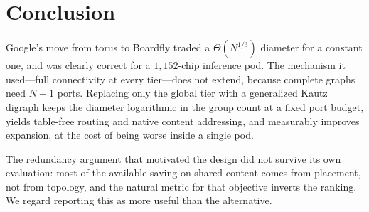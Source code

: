 \documentclass[sigconf,nonacm]{acmart}
\theoremstyle{acmdefinition}%
\begin{document}
\section{Conclusion}

Google's move from torus to Boardfly traded a $\Theta(N^{1/3})$ diameter for a
constant one, and was clearly correct for a $1{,}152$-chip inference pod. The
mechanism it used---full connectivity at every tier---does not extend, because
complete graphs need $N-1$ ports. Replacing only the global tier with a
generalized Kautz digraph keeps the diameter logarithmic in the group count at a
fixed port budget, yields table-free routing and native content addressing, and
measurably improves expansion, at the cost of being worse inside a single pod.

The redundancy argument that motivated the design did not survive its own
evaluation: most of the available saving on shared content comes from placement,
not from topology, and the natural metric for that objective inverts the
ranking. We regard reporting this as more useful than the alternative.

\balance


\end{document}
